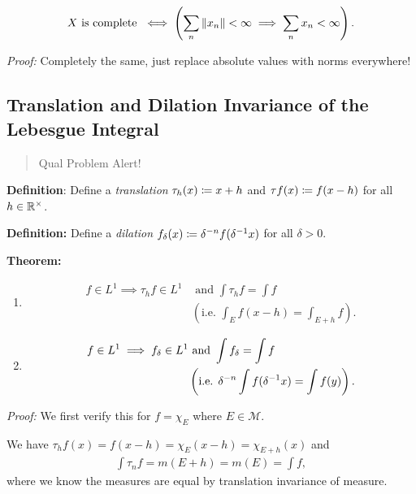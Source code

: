 \begin{align*}
X \text{ is complete } \iff \left( \sum_n {\left\lVert {x_n} \right\rVert} < \infty \implies \sum_n x_n < \infty \right)
.\end{align*}

\emph{Proof:} Completely the same, just replace absolute values with
norms everywhere!

\hypertarget{translation-and-dilation-invariance-of-the-lebesgue-integral}{%
\subsection{Translation and Dilation Invariance of the Lebesgue
Integral}\label{translation-and-dilation-invariance-of-the-lebesgue-integral}}

\begin{quote}
Qual Problem Alert!
\end{quote}

\textbf{Definition}: Define a \emph{translation}
\(\tau_h(x) \coloneqq x+h\) and \(\tau f(x) \coloneqq f(x-h)\) for all
\(h\in{\mathbb{R}}^{\times}\).

\textbf{Definition:} Define a \emph{dilation}
\(f_\delta(x) \coloneqq \delta^{-n} f(\delta^{-1} x)\) for all
\(\delta > 0\).

\textbf{Theorem:}

\begin{enumerate}
\def\labelenumi{\arabic{enumi}.}
\item
  \begin{align*}
  f\in L^1 \implies \tau_h f\in L^1 &\text{ and } \int \tau_h f = \int f \\ 
  &\left( \text{i.e. } \int_E f(x-h) = \int_{E + h} f \right)
  .\end{align*}
\item
  \begin{align*}
  f\in L^1 \implies f_\delta \in L^1 &\text{ and } \int f_\delta = \int f \\ 
  &\left( \text{i.e. } \delta^{-n} \int f(\delta^{-1} x) = \int f(y) \right)
  .\end{align*}
\end{enumerate}

\emph{Proof:} We first verify this for \(f = \chi_E\) where
\(E \in \mathcal M\).

We have \(\tau_h f(x) = f(x-h) = \chi_E(x-h) = \chi_{E + h}(x)\) and
\begin{align*}
\int \tau_n f = m(E+h) = m(E) = \int f
,\end{align*} where we know the measures are equal by translation
invariance of measure.

